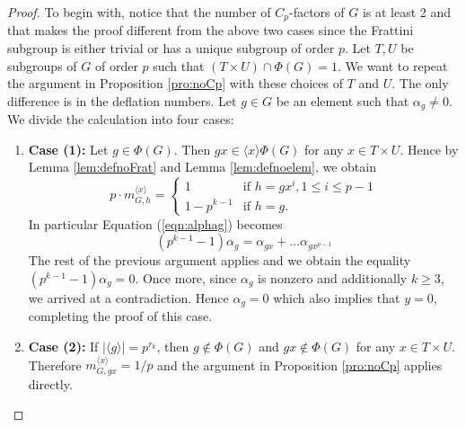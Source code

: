\documentclass[12pt]{article}
\theoremstyle{plain}
\theoremstyle{definition}
\begin{document}
\begin{proof} To begin with, notice that the number of $C_p$-factors of $G$ is at least 2 and that makes the proof different from the above two cases since the Frattini subgroup is either trivial or has a unique subgroup of order $p$. Let $T, U$ be subgroups of $G$ of order $p$ such that $(T\times U)\cap \Phi(G) = 1$. We want to repeat the argument in Proposition \ref{pro:noCp} with these choices of $T$ and $U$. The only difference is in the deflation numbers. Let $g\in G$ be an element such that $\alpha_g\not = 0$. We divide the calculation into four cases:
\begin{enumerate}
    \item[] \textbf{Case (1):} Let $g\in \Phi(G)$. Then $gx\in\langle x\rangle\Phi(G)$ for any $x\in T\times U$. Hence by Lemma \ref{lem:defnoFrat} and Lemma \ref{lem:defnoelem}, we obtain
    \[
    p\cdot m_{G, h}^{\langle x\rangle} = \begin{cases}
              1 & \text{if } h = gx^{i}, 1\le i\le p-1\\
            1 - p^{k-1} & \text{if } h = g.
          \end{cases} 
    \]
    In particular Equation (\ref{eqn:alphag}) becomes
    \begin{equation}\label{eqn:alphag2}
        (p^{k-1}-1)\alpha_g = \alpha_{gx} + \ldots \alpha_{gx^{p-1}} 
    \end{equation}
    The rest of the previous argument applies and we obtain the equality $(p^{k-1}-1)\alpha_g = 0$. Once more, since $\alpha_g$ is nonzero and additionally $k\ge 3$, we arrived at a contradiction. Hence $\alpha_g = 0$ which also implies that $y = 0$, completing the proof of this case. 
    \item[] \textbf{Case (2):} If $|\langle g\rangle| = p^{r_k}$, then $g\not \in\Phi(G)$ and $gx\not\in\Phi(G)$ for any $x\in T\times U$. Therefore $m_{G, gx}^{\langle x\rangle}=1/p$ and the argument in Proposition \ref{pro:noCp} applies directly.
    

\end{enumerate}
\end{proof}
\end{document}
